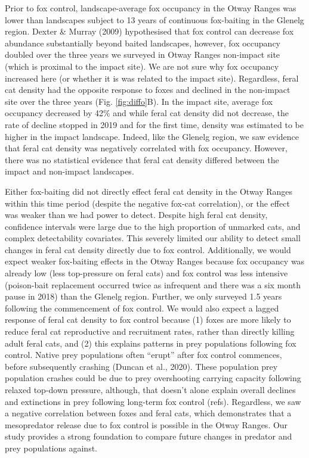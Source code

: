 \documentclass[]{elsarticle} %
\begin{document}
Prior to fox control, landscape-average fox occupancy in the Otway Ranges was lower than landscapes subject to 13 years of continuous fox-baiting in the Glenelg region. Dexter \& Murray (2009) hypothesised that fox control can decrease fox abundance substantially beyond baited landscapes, however, fox occupancy doubled over the three years we surveyed in Otway Ranges non-impact site (which is proximal to the impact site). We are not sure why fox occupancy increased here (or whether it is was related to the impact site). Regardless, feral cat density had the opposite response to foxes and declined in the non-impact site over the three years (Fig. \ref{fig:diffo}B). In the impact site, average fox occupancy decreased by 42\% and while feral cat density did not decrease, the rate of decline stopped in 2019 and for the first time, density was estimated to be higher in the impact landscape. Indeed, like the Glenelg region, we saw evidence that feral cat density was negatively correlated with fox occupancy. However, there was no statistical evidence that feral cat density differed between the impact and non-impact landscapes.

Either fox-baiting did not directly effect feral cat density in the Otway Ranges within this time period (despite the negative fox-cat correlation), or the effect was weaker than we had power to detect. Despite high feral cat density, confidence intervals were large due to the high proportion of unmarked cats, and complex detectability covariates. This severely limited our ability to detect small changes in feral cat density directly due to fox control. Additionally, we would expect weaker fox-baiting effects in the Otway Ranges because fox occupancy was already low (less top-pressure on feral cats) and fox control was less intensive (poison-bait replacement occurred twice as infrequent and there was a six month pause in 2018) than the Glenelg region. Further, we only surveyed 1.5 years following the commencement of fox control. We would also expect a lagged response of feral cat density to fox control because (1) foxes are more likely to reduce feral cat reproductive and recruitment rates, rather than directly killing adult feral cats, and (2) this explains patterns in prey populations following fox control. Native prey populations often ``erupt'' after fox control commences, before subsequently crashing (Duncan et al., 2020). These population prey population crashes could be due to prey overshooting carrying capacity following relaxed top-down pressure, although, that doesn't alone explain overall declines and extinctions in prey following long-term fox control (refs). Regardless, we saw a negative correlation between foxes and feral cats, which demonstrates that a mesopredator release due to fox control is possible in the Otway Ranges. Our study provides a strong foundation to compare future changes in predator and prey populations against.
\end{document}
